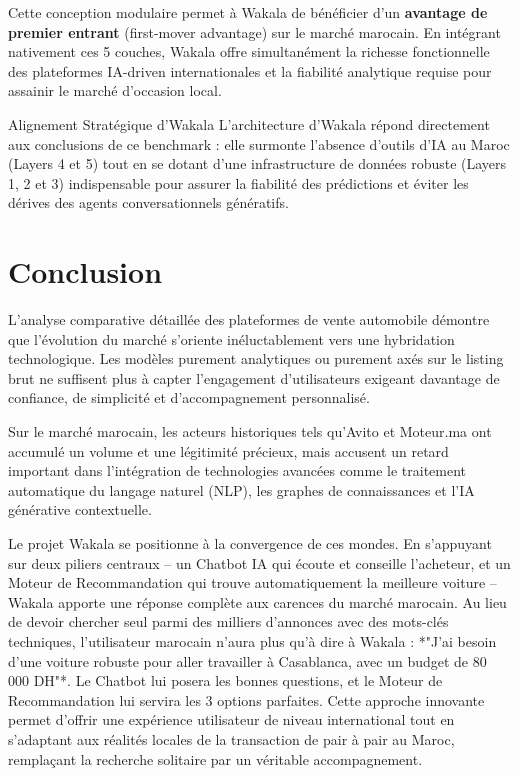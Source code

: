 \documentclass[11pt,a4paper]{article}
\begin{document}
Cette conception modulaire permet à Wakala de bénéficier d'un \textbf{avantage de premier entrant} (first-mover advantage) sur le marché marocain. En intégrant nativement ces 5 couches, Wakala offre simultanément la richesse fonctionnelle des plateformes IA-driven internationales et la fiabilité analytique requise pour assainir le marché d'occasion local.

\begin{insightbox}{Alignement Stratégique d'Wakala}
L'architecture d'Wakala répond directement aux conclusions de ce benchmark : elle surmonte l'absence d'outils d'IA au Maroc (Layers 4 et 5) tout en se dotant d'une infrastructure de données robuste (Layers 1, 2 et 3) indispensable pour assurer la fiabilité des prédictions et éviter les dérives des agents conversationnels génératifs.
\end{insightbox}

\newpage

\section{Conclusion}

L'analyse comparative détaillée des plateformes de vente automobile démontre que l'évolution du marché s'oriente inéluctablement vers une hybridation technologique. Les modèles purement analytiques ou purement axés sur le listing brut ne suffisent plus à capter l'engagement d'utilisateurs exigeant davantage de confiance, de simplicité et d'accompagnement personnalisé. 

Sur le marché marocain, les acteurs historiques tels qu'Avito et Moteur.ma ont accumulé un volume et une légitimité précieux, mais accusent un retard important dans l'intégration de technologies avancées comme le traitement automatique du langage naturel (NLP), les graphes de connaissances et l'IA générative contextuelle. 

Le projet Wakala se positionne à la convergence de ces mondes. En s'appuyant sur deux piliers centraux -- un Chatbot IA qui écoute et conseille l'acheteur, et un Moteur de Recommandation qui trouve automatiquement la meilleure voiture -- Wakala apporte une réponse complète aux carences du marché marocain. 
Au lieu de devoir chercher seul parmi des milliers d'annonces avec des mots-clés techniques, l'utilisateur marocain n'aura plus qu'à dire à Wakala : *"J'ai besoin d'une voiture robuste pour aller travailler à Casablanca, avec un budget de 80 000 DH"*. Le Chatbot lui posera les bonnes questions, et le Moteur de Recommandation lui servira les 3 options parfaites. Cette approche innovante permet d'offrir une expérience utilisateur de niveau international tout en s'adaptant aux réalités locales de la transaction de pair à pair au Maroc, remplaçant la recherche solitaire par un véritable accompagnement.
\end{document}
